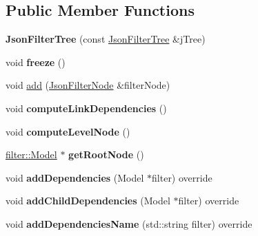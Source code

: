 \subsection*{Public Member Functions}
\begin{DoxyCompactItemize}
\item 
\mbox{\label{classjson_1_1_json_filter_tree_aa7819d6838b8046ff3906ea6bd6fa66f}} 
{\bfseries Json\+Filter\+Tree} (const \hyperlink{classjson_1_1_json_filter_tree}{Json\+Filter\+Tree} \&j\+Tree)
\item 
\mbox{\label{classjson_1_1_json_filter_tree_ad1ec96718c7c454d4e3f19ba8d43146e}} 
void {\bfseries freeze} ()
\item 
void \hyperlink{classjson_1_1_json_filter_tree_aee36fd03a671233001426a3c6657f0f8}{add} (\hyperlink{classjson_1_1_json_filter_node}{Json\+Filter\+Node} \&filter\+Node)
\item 
\mbox{\label{classjson_1_1_json_filter_tree_a4ed24b965ae9071fccb678f3567b3aea}} 
void {\bfseries compute\+Link\+Dependencies} ()
\item 
\mbox{\label{classjson_1_1_json_filter_tree_a005fdda47cd93ffb7531d0985f75bb42}} 
void {\bfseries compute\+Level\+Node} ()
\item 
\mbox{\label{classjson_1_1_json_filter_tree_a467aa6119f119a25ed71dd786d8850fa}} 
\hyperlink{classfilter_1_1_model}{filter\+::\+Model} $\ast$ {\bfseries get\+Root\+Node} ()
\item 
\mbox{\label{classjson_1_1_json_filter_tree_ab7ad587899cfa6a5ae76e3bc4ca2234f}} 
void {\bfseries add\+Dependencies} (Model $\ast$filter) override
\item 
\mbox{\label{classjson_1_1_json_filter_tree_af65e7e183cfe7cab7b2529fa34579fd6}} 
void {\bfseries add\+Child\+Dependencies} (Model $\ast$filter) override
\item 
\mbox{\label{classjson_1_1_json_filter_tree_af6301cab0669da01d7cd75f3468dc4a7}} 
void {\bfseries add\+Dependencies\+Name} (std\+::string filter) override

\end{DoxyCompactItemize}
